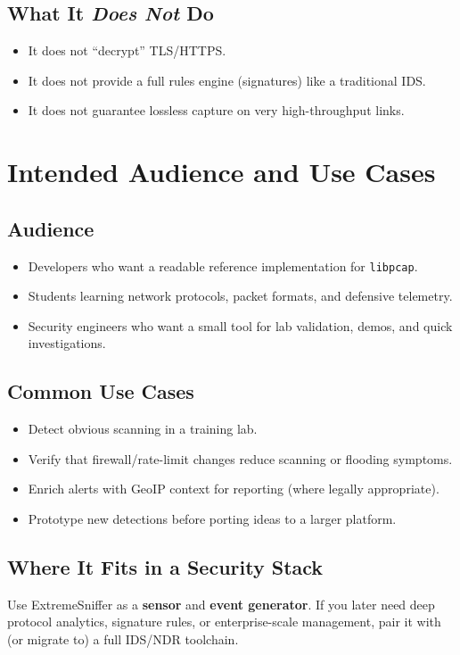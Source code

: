 \documentclass[14pt]{extarticle}
\begin{document}
\subsection{What It \emph{Does Not} Do}
\begin{itemize}
  \item It does not ``decrypt'' TLS/HTTPS.
  \item It does not provide a full rules engine (signatures) like a traditional IDS.
  \item It does not guarantee lossless capture on very high-throughput links.
\end{itemize}

\section{Intended Audience and Use Cases}
\subsection{Audience}
\begin{itemize}
  \item Developers who want a readable reference implementation for \texttt{libpcap}.
  \item Students learning network protocols, packet formats, and defensive telemetry.
  \item Security engineers who want a small tool for lab validation, demos, and quick investigations.
\end{itemize}

\subsection{Common Use Cases}
\begin{itemize}
  \item Detect obvious scanning in a training lab.
  \item Verify that firewall/rate-limit changes reduce scanning or flooding symptoms.
  \item Enrich alerts with GeoIP context for reporting (where legally appropriate).
  \item Prototype new detections before porting ideas to a larger platform.
\end{itemize}

\subsection{Where It Fits in a Security Stack}
\begin{tcolorbox}[title=Positioning]
Use ExtremeSniffer as a \textbf{sensor} and \textbf{event generator}. If you later need deep protocol analytics, signature rules, or enterprise-scale management, pair it with (or migrate to) a full IDS/NDR toolchain.
\end{tcolorbox}
\end{document}
